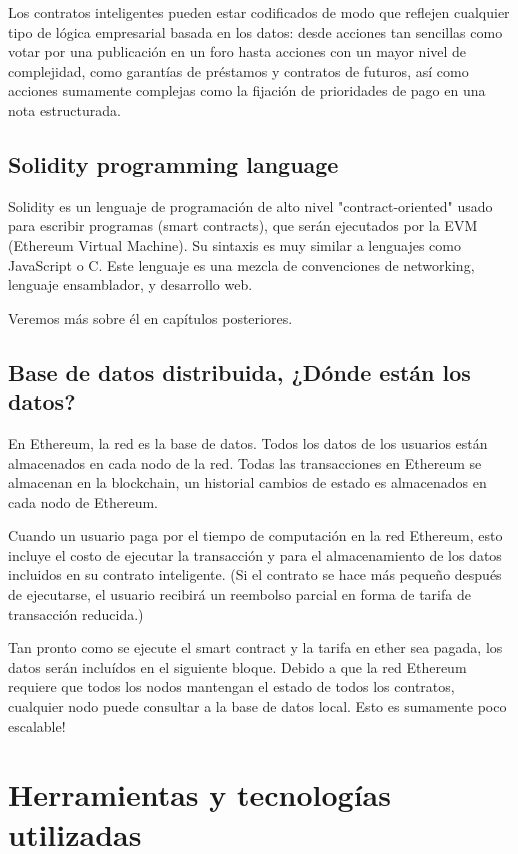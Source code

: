 Los contratos inteligentes pueden estar codificados de modo que reflejen cualquier tipo de lógica
empresarial basada en los datos: desde acciones tan sencillas como votar por una publicación en un
foro hasta acciones con un mayor nivel de complejidad, como garantías de préstamos y contratos de
futuros, así como acciones sumamente complejas como la fijación de prioridades de pago en una nota
estructurada.


\subsection{Solidity programming language}
Solidity es un lenguaje de programación de alto nivel "contract-oriented" usado para escribir
programas (smart contracts), que serán ejecutados por la EVM (Ethereum Virtual Machine). Su
sintaxis es muy similar a lenguajes como JavaScript o C.
Este lenguaje es una mezcla de convenciones de networking, lenguaje ensamblador, y desarrollo web.

Veremos más sobre él en capítulos posteriores.

\subsection{Base de datos distribuida, ¿Dónde están los datos?}
En Ethereum, la red es la base de datos. Todos los datos de los usuarios están almacenados en 
cada nodo de la red. Todas las transacciones en Ethereum se almacenan en la blockchain, un
historial cambios de estado es almacenados en cada nodo de Ethereum.

Cuando un usuario paga por el tiempo de computación en la red Ethereum, esto incluye el costo
de ejecutar la transacción y para el almacenamiento de los datos incluidos en su contrato
inteligente. (Si el contrato se hace más pequeño después de ejecutarse, el usuario recibirá un
reembolso parcial en forma de tarifa de transacción reducida.)

Tan pronto como se ejecute el smart contract y la tarifa en ether sea pagada, los datos serán
incluídos en el siguiente bloque. Debido a que la red Ethereum requiere que todos los nodos
mantengan el estado de todos los contratos, cualquier nodo puede consultar a la base de datos
local. Esto es sumamente poco escalable!



\section{Herramientas y tecnologías utilizadas}
